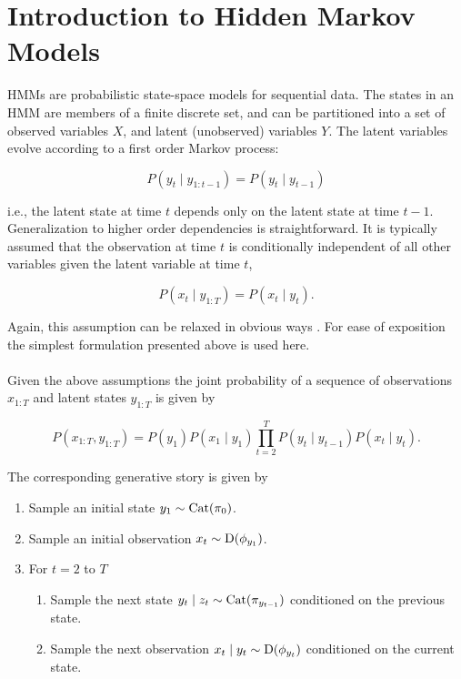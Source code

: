 \documentclass[12pt]{report}
\newcommand{\1}[0]{\mathbbm{1}}
\newcommand{\Cat}[0]{\textnormal{Cat}}
\newcommand{\SomeDist}[0]{\textnormal{D}}
\newcommand{\seq}[3]{\ensuremath{#1_{{#2}:{#3}}}}
\begin{document}
\section{Introduction to Hidden Markov Models}
\label{sec:Introduction to Hidden Markov Models}
\acp{HMM} are probabilistic state-space models for sequential data.
The states in an \ac{HMM} are members of a finite discrete set, and
can be partitioned into a set of observed variables $X$, and latent
(unobserved) variables $Y$. The latent variables evolve according to
a first order Markov process:

\[
    P(y_t \mid \seq{y}{1}{t-1}) = P(y_t \mid y_{t-1})
\]

i.e., the latent state at time $t$ depends only on the latent state
at time $t-1$. Generalization to higher order dependencies is straightforward.
It is typically assumed that the observation at time $t$ is conditionally
independent of all other variables given the latent variable at time $t$,

\[
    P(x_t \mid \seq{y}{1}{T}) = P(x_t \mid y_t).
\]

Again, this assumption can be relaxed in obvious ways \cite{autoregressive-shannon}.
For ease of exposition the simplest formulation presented above is used here.
\\\\
Given the above assumptions the joint probability of a sequence of observations
$\seq{x}{1}{T}$ and latent states $\seq{y}{1}{T}$ is given by

\begin{equation}\label{eq:hmm-joint}
    P(\seq{x}{1}{T}, \seq{y}{1}{T}) =
    P(y_1)P(x_1 \mid y_1) \prod_{t=2}^T P(y_t \mid y_{t-1}) P(x_t \mid y_t).
\end{equation}

The corresponding generative story is given by

\begin{enumerate}
    \item Sample an initial state $y_1 \sim \Cat(\pi_0)$.
    \item Sample an initial observation $x_t \sim \SomeDist(\phi_{y_1})$.
    \item For $t = 2$ to $T$
    \begin{enumerate}
        \item Sample the next state $y_{t} \mid z_t \sim \Cat(\pi_{y_{t-1}})$ conditioned on the previous state.
        \item Sample the next observation $x_t \mid y_t \sim \SomeDist(\phi_{y_t})$ conditioned on the current state.
    \end{enumerate}
\end{enumerate}
\end{document}

